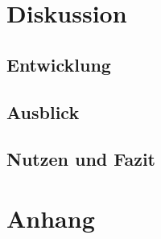 \documentclass[a4paper,12pt,ngerman]{scrartcl}
\begin{document}
\newpage

\section{Diskussion}

\subsection{Entwicklung}

\subsection{Ausblick}

\subsection{Nutzen und Fazit}

\newpage

\section{Anhang}
\end{document}

